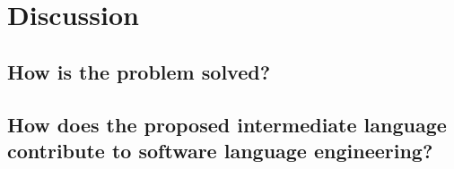 \section{Discussion}
\label{sec:discussion}
\subsection{How is the problem solved?}

\subsection{How does the proposed intermediate language contribute to software language engineering?}